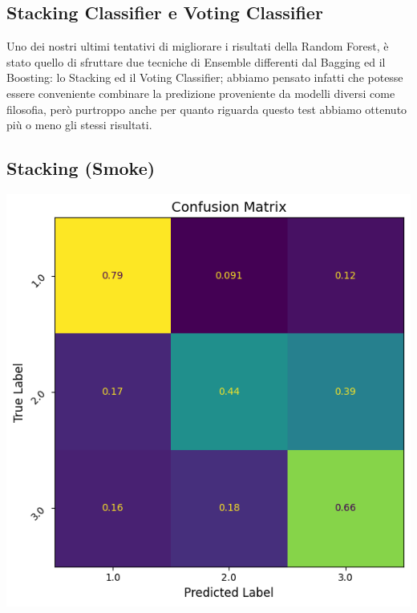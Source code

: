 \subsection{Stacking Classifier e Voting Classifier}
Uno dei nostri ultimi tentativi di migliorare i risultati della Random Forest, è stato quello di sfruttare due tecniche di Ensemble differenti dal Bagging ed il Boosting: lo Stacking ed il Voting Classifier; abbiamo pensato infatti che potesse essere conveniente combinare la predizione proveniente da modelli diversi come filosofia, però purtroppo anche per quanto riguarda questo test abbiamo ottenuto più o meno gli stessi risultati.

\subsection*{Stacking (Smoke)}
\begin{center}
\begin{minipage}[c]{0.50\columnwidth}
\end{minipage}\hspace{\columnsep}%
\begin{minipage}[c]{0.40\columnwidth}
\centering
\includegraphics[width=\columnwidth,height=0.75\columnwidth,keepaspectratio]{screen_results/confusion_matrix_stacking_s.png}
\end{minipage}
\end{center}

